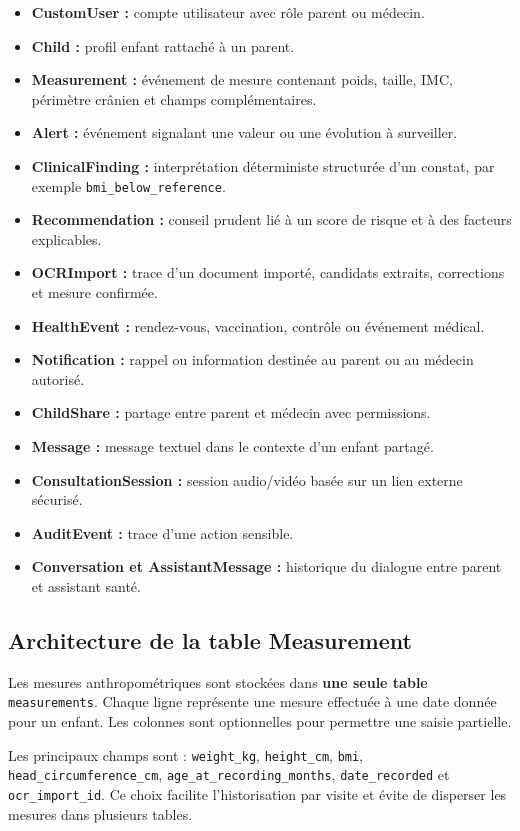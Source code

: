 \begin{itemize}
    \item \textbf{CustomUser :} compte utilisateur avec rôle parent ou médecin.
    \item \textbf{Child :} profil enfant rattaché à un parent.
    \item \textbf{Measurement :} événement de mesure contenant poids, taille, IMC, périmètre crânien et champs complémentaires.
    \item \textbf{Alert :} événement signalant une valeur ou une évolution à surveiller.
    \item \textbf{ClinicalFinding :} interprétation déterministe structurée d'un constat, par exemple \texttt{bmi\_below\_reference}.
    \item \textbf{Recommendation :} conseil prudent lié à un score de risque et à des facteurs explicables.
    \item \textbf{OCRImport :} trace d'un document importé, candidats extraits, corrections et mesure confirmée.
    \item \textbf{HealthEvent :} rendez-vous, vaccination, contrôle ou événement médical.
    \item \textbf{Notification :} rappel ou information destinée au parent ou au médecin autorisé.
    \item \textbf{ChildShare :} partage entre parent et médecin avec permissions.
    \item \textbf{Message :} message textuel dans le contexte d'un enfant partagé.
    \item \textbf{ConsultationSession :} session audio/vidéo basée sur un lien externe sécurisé.
    \item \textbf{AuditEvent :} trace d'une action sensible.
    \item \textbf{Conversation et AssistantMessage :} historique du dialogue entre parent et assistant santé.
\end{itemize}

\subsection{Architecture de la table Measurement}

Les mesures anthropométriques sont stockées dans \textbf{une seule table} \texttt{measurements}. Chaque ligne représente une mesure effectuée à une date donnée pour un enfant. Les colonnes sont optionnelles pour permettre une saisie partielle.

Les principaux champs sont : \texttt{weight\_kg}, \texttt{height\_cm}, \texttt{bmi}, \texttt{head\_circumference\_cm}, \texttt{age\_at\_recording\_months}, \texttt{date\_recorded} et \texttt{ocr\_import\_id}. Ce choix facilite l'historisation par visite et évite de disperser les mesures dans plusieurs tables.

